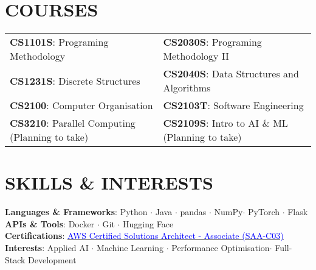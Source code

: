\documentclass[letterpaper,11pt]{article}
\begin{document}
\section{COURSES}
\begin{tabularx}{\textwidth}{X X}
  \textbf{CS1101S}: Programing Methodology & \textbf{CS2030S}: Programing Methodology II \\
  \textbf{CS1231S}: Discrete Structures & \textbf{CS2040S}: Data Structures and Algorithms \\
  \textbf{CS2100}: Computer Organisation & \textbf{CS2103T}: Software Engineering \\
  \textbf{CS3210}: Parallel Computing (Planning to take)& \textbf{CS2109S}: Intro to AI \& ML (Planning to take)\\
\end{tabularx}

\section{SKILLS \& INTERESTS}
 \begin{itemize}[leftmargin=0.15in, label={}]
    \small{\item{
    \vspace{1mm}
    \textbf{Languages \& Frameworks}{: Python {\bfseries\large$\cdot$} Java {\bfseries\large$\cdot$} pandas {\bfseries\large$\cdot$} NumPy{\bfseries\large$\cdot$} PyTorch {\bfseries\large$\cdot$} Flask} \\
    \vspace{1mm}
    \textbf{APIs \& Tools}{: Docker {\bfseries\large$\cdot$} Git {\bfseries\large$\cdot$} Hugging Face } \\
    \vspace{1mm}
    \textbf{Certifications}{: \href{https://www.credly.com/badges/bdd6f6cb-d507-41a4-954f-b4cfb2d3a049/public_url}{\underline{\textcolor{blue}{AWS Certified Solutions Architect - Associate (SAA-C03)}}}} \\
    \vspace{1mm}
    \textbf{Interests}{: Applied AI {\bfseries\large$\cdot$} Machine Learning {\bfseries\large$\cdot$} Performance Optimisation{\bfseries\large$\cdot$} Full-Stack Development} \\
    }}
 \end{itemize}
 \begin{center}
\end{center}
\end{document}
